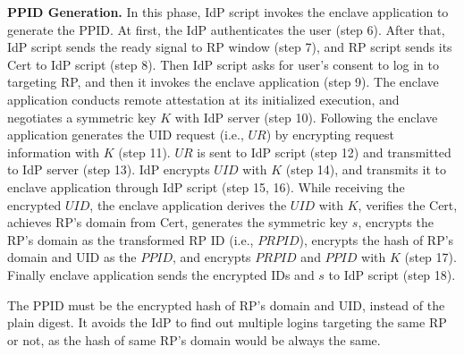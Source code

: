 \vspace{0.5mm}\noindent\textbf{PPID Generation.} In this phase, IdP script invokes the enclave application to generate the PPID. 
At first, the IdP authenticates the user (step 6). After that, IdP script sends the ready signal to RP window (step 7), and RP script sends its Cert to IdP script (step 8).  Then IdP script asks for user's consent to log in to targeting RP, and then it invokes the enclave application (step 9). The enclave application conducts remote attestation at its initialized execution, and negotiates a symmetric key $K$ with IdP server (step 10). Following the enclave application generates the UID request (i.e., $UR$) by encrypting request information with $K$ (step 11). $UR$ is sent to IdP script (step 12) and transmitted to IdP server (step 13). IdP encrypts $UID$ with $K$ (step 14), and transmits it to enclave application through IdP script (step 15, 16).  While receiving the encrypted $UID$, the enclave application derives the $UID$ with $K$, verifies the Cert, achieves RP's domain from Cert, generates the symmetric key $s$, encrypts the RP's domain as the transformed RP ID (i.e., $PRPID$), encrypts the hash of RP's domain and UID as the $PPID$, and encrypts $PRPID$ and $PPID$ with $K$ (step 17). Finally enclave application sends the encrypted IDs and $s$ to IdP script (step 18). 

The PPID must be the encrypted hash of RP's domain and UID, instead of the plain digest. It avoids the IdP to find out multiple logins targeting the same RP or not, as the hash of same RP's domain would be always the same. 

